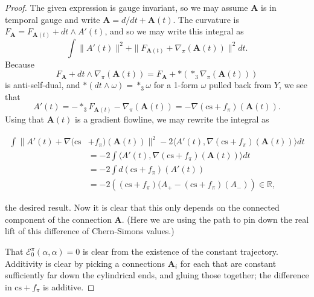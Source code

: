\documentclass{memo-l}
\theoremstyle{definition}
\theoremstyle{remark}
\numberwithin{section}{chapter}
\numberwithin{equation}{chapter}
\begin{document}
\begin{proof}The given expression is gauge invariant, so we may assume $\mathbf{A}$ is in temporal gauge and write $\mathbf{A} = d/dt + \mathbf{A}(t)$. The curvature is $F_{\mathbf{A}} = F_{\mathbf{A}(t)} + dt \wedge A'(t)$, and so we may write this integral as 
$$\int \|A'(t)\|^2 + \|F_{\mathbf{A}(t)} + \nabla_\pi\left(\mathbf{A}(t)\right)\|^2 dt.$$ 
Because 
$$F_{\mathbf{A}} + dt \wedge \nabla_\pi(\mathbf{A}(t)) = F_{\mathbf{A}} + *(*_3 \nabla_\pi(\mathbf{A}(t)))$$ 
is anti-self-dual, and $*(dt \wedge \omega) = *_3 \omega$ for a 1-form $\omega$ pulled back from $Y$, we see that 
$$A'(t) = - *_3 F_{\mathbf{A}(t)} - \nabla_\pi(\mathbf{A}(t)) = - \nabla(\text{cs} + f_\pi)(\mathbf{A}(t)).$$ 
Using that $\mathbf{A}(t)$ is a gradient flowline, we may rewrite the integral as 

\begin{align*}\int \|A'(t) + \nabla(\text{cs}&+f_\pi)(\mathbf{A}(t))\|^2 - 2\langle A'(t), \nabla(\text{cs}+f_\pi)(\mathbf{A}(t))\rangle dt \\
&= -2 \int \langle A'(t), \nabla(\text{cs}+f_\pi)(\mathbf{A}(t)) \rangle dt \\
&= -2 \int d(\text{cs}+f_{\pi})(A'(t))\\
&= -2\left((\text{cs}+f_\pi)(A_+ - (\text{cs}+f_\pi)(A_-)\right) \in \mathbb R,\end{align*}

the desired result. Now it is clear that this only depends on the connected component of the connection $\mathbf{A}$. (Here we are using the path to pin down the real lift of this difference of Chern-Simons values.) 

That $\mathcal E^\pi_0(\alpha, \alpha) = 0$ is clear from the existence of the constant trajectory. Additivity is clear by picking a connections $\mathbf{A}_i$ for each that are constant sufficiently far down the cylindrical ends, and gluing those together; the difference in $\text{cs}+f_\pi$ is additive.


\end{proof}
\end{document}
